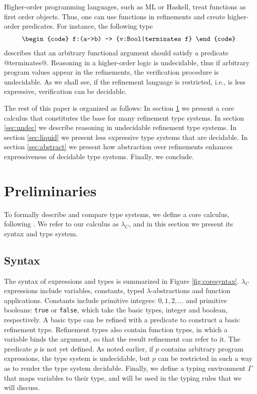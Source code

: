 Higher-order programming languages, such as ML or Haskell, 
treat functions as first order objects.
Thus, one can use functions in refinements and 
create higher-order predicates. 
For instance, the following type
%
$$\centering\begin{tabular}{c}\begin{code}
f:(a->b) -> {v:Bool|terminates f}
\end{code}\end{tabular}$$
%
describes that an arbitrary functional argument
should satisfy a predicate @terminates@.
%
Reasoning in a higher-order logic is undecidable, 
thus if arbitrary program values appear in the refinements,
the verification procedure is undecidable.
%
As we shall see, 
if the refinement language is restricted, i.e., is less expressive,
verification can be decidable.

The rest of this paper is organized as follows:
In section \ref{subsec:formal} we present a core calculus
that constitutes the base for many refinement type systems.
In section \ref{sec:undec}
we describe reasoning in undecidable refinement type systems.
In section \ref{sec:liquid}
we present less expressive type systems
that are decidable.
In section \ref{sec:abstract} 
we present how abstraction over refinements
enhances expressiveness of decidable type systems. 
Finally, we conclude.

\section{Preliminaries}\label{subsec:formal}

To formally describe and compare type systems, 
we define a core calculus, following \cite{flanagan06, LiquidPLDI08, Greenberg12}.
We refer to our calculus as $\lambda_C$, 
and in this section we present its syntax and type system.

\subsection{Syntax}
The syntax of expressions and types is summarized in Figure \ref{fig:coresyntax}.
$\lambda_C$ expressions include variables, constants,
typed $\lambda$-abstractions
and function applications. 
%
Constants include primitive integers:
$0, 1, 2, \dots$ and primitive booleans: \texttt{true} or \texttt{false},
which take the basic types, integer and boolean, respectively.
%
A basic type can be refined with a predicate to construct a basic
refinement type.
Refinement types also contain function types, 
in which 
a variable binds the argument,
so that the result refinement can refer to it.  
%
The predicate $p$ is
not yet defined. 
As noted earlier, if $p$ contains arbitrary program 
expressions, the type system is undecidable, but 
$p$ can be restricted in such a way as to render 
the type system decidable.
%
Finally, we define a typing environment $\Gamma$ that maps variables to their type,
and will be used in the typing rules that we will discuss.


